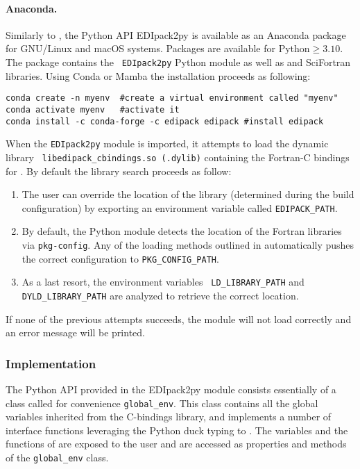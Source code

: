 \documentclass[edipack_sp.tex]{subfiles}
\begin{document}
\paragraph{Anaconda.}
Similarly to \NAME, the Python API EDIpack2py is available as an
Anaconda package for GNU/Linux and macOS systems. Packages are available for
Python$\geq 3.10$. The \NAME package contains the {\tt
  EDIpack2py} Python module as well as \NAME and SciFortran
libraries. 
Using Conda or Mamba the installation proceeds as following:
\begin{lstlisting}[style=mybash]
conda create -n myenv  #create a virtual environment called "myenv"
conda activate myenv   #activate it
conda install -c conda-forge -c edipack edipack #install edipack
\end{lstlisting}

\noindent
When the {\tt EDIpack2py}    module is imported, it attempts to load the dynamic library {\tt
  libedipack\-\_cbindings.so (.dylib)} containing the Fortran-C bindings
for \NAME. By default the library search proceeds as follow: 
\begin{enumerate}
\item The user can override the location of the library
  (determined during the \NAME build configuration) by exporting an
  environment variable called {\tt EDIPACK\_PATH}.
\item By default, the Python module detects the location of the
  Fortran libraries via {\tt pkg-config}. Any of the loading methods
  outlined in  automatically pushes the
  correct configuration to {\tt PKG\_CONFIG\_PATH}. 
\item As a last resort, the environment variables {\tt
    LD\_LIBRARY\_PATH} and {\tt DYLD\_LIBRARY\_PATH} are analyzed to
  retrieve the correct location. 
\end{enumerate}
If none of the previous attempts succeeds, the module will not load correctly and an error message will be printed. 



\subsubsection{Implementation}\label{sSecInteropEDIpyImplementation}
The Python API provided in the EDIpack2py module consists essentially of a
class called for convenience {\tt global\_env}.
This class contains all the global variables inherited from the \NAME
C-bindings library, and implements a number of interface functions
leveraging the Python duck typing to \NAME.  
The variables and the functions of \NAME are exposed to the user and
are accessed as properties and
methods of the {\tt global\_env} class.
\end{document}
